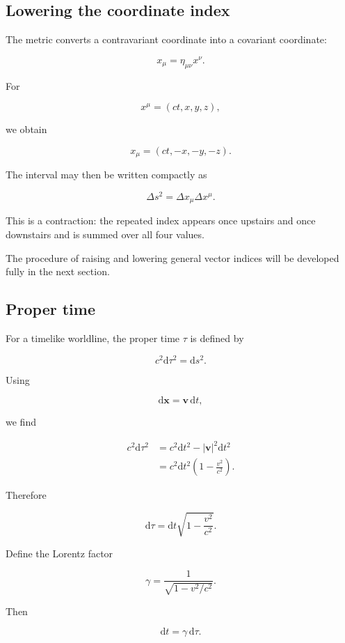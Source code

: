 \subsection{Lowering the coordinate index}

The metric converts a contravariant coordinate into a covariant coordinate:

\[
x_{\mu}
=
\eta_{\mu\nu}x^{\nu}.
\]

For

\[
x^{\mu}=(ct,x,y,z),
\]

we obtain

\[
\boxed{
x_{\mu}=(ct,-x,-y,-z)
}.
\]

The interval may then be written compactly as

\[
\Delta s^{2}
=
\Delta x_{\mu}\Delta x^{\mu}.
\]

This is a contraction: the repeated index appears once upstairs and once downstairs and is summed over all four values.

The procedure of raising and lowering general vector indices will be developed fully in the next section.

\subsection{Proper time}

For a timelike worldline, the proper time \(\tau\) is defined by

\[
\boxed{
c^{2}\mathrm{d}\tau^{2}
=
\mathrm{d}s^{2}
}.
\]

Using

\[
\mathrm{d}\mathbf{x}
=
\mathbf{v}\,\mathrm{d}t,
\]

we find

\[
\begin{aligned}
c^{2}\mathrm{d}\tau^{2}
&=
c^{2}\mathrm{d}t^{2}
-
|\mathbf{v}|^{2}\mathrm{d}t^{2}\\
&=
c^{2}\mathrm{d}t^{2}
\left(1-
\frac{v^{2}}{c^{2}}
\right).
\end{aligned}
\]

Therefore

\[
\boxed{
\mathrm{d}\tau
=
\mathrm{d}t
\sqrt{1-
\frac{v^{2}}{c^{2}}}
}.
\]

Define the Lorentz factor

\[
\boxed{
\gamma
=
\frac{1}{\sqrt{1-v^{2}/c^{2}}}
}.
\]

Then

\[
\boxed{
\mathrm{d}t
=
\gamma\,\mathrm{d}\tau
}.
\]

